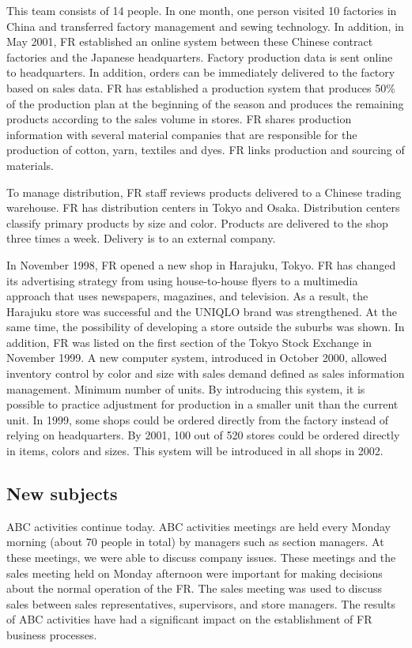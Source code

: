\documentclass[12pt,]{article}
\begin{document}
This team consists of 14 people. In one month, one person visited 10
factories in China and transferred factory management and sewing
technology. In addition, in May 2001, FR established an online system
between these Chinese contract factories and the Japanese headquarters.
Factory production data is sent online to headquarters. In addition,
orders can be immediately delivered to the factory based on sales data.
FR has established a production system that produces 50\% of the
production plan at the beginning of the season and produces the
remaining products according to the sales volume in stores. FR shares
production information with several material companies that are
responsible for the production of cotton, yarn, textiles and dyes. FR
links production and sourcing of materials.

To manage distribution, FR staff reviews products delivered to a Chinese
trading warehouse. FR has distribution centers in Tokyo and Osaka.
Distribution centers classify primary products by size and color.
Products are delivered to the shop three times a week. Delivery is to an
external company.

In November 1998, FR opened a new shop in Harajuku, Tokyo. FR has
changed its advertising strategy from using house-to-house flyers to a
multimedia approach that uses newspapers, magazines, and television. As
a result, the Harajuku store was successful and the UNIQLO brand was
strengthened. At the same time, the possibility of developing a store
outside the suburbs was shown. In addition, FR was listed on the first
section of the Tokyo Stock Exchange in November 1999. A new computer
system, introduced in October 2000, allowed inventory control by color
and size with sales demand defined as sales information management.
Minimum number of units. By introducing this system, it is possible to
practice adjustment for production in a smaller unit than the current
unit. In 1999, some shops could be ordered directly from the factory
instead of relying on headquarters. By 2001, 100 out of 520 stores could
be ordered directly in items, colors and sizes. This system will be
introduced in all shops in 2002.

\hypertarget{new-subjects}{%
\subsection{New subjects}\label{new-subjects}}

ABC activities continue today. ABC activities meetings are held every
Monday morning (about 70 people in total) by managers such as section
managers. At these meetings, we were able to discuss company issues.
These meetings and the sales meeting held on Monday afternoon were
important for making decisions about the normal operation of the FR. The
sales meeting was used to discuss sales between sales representatives,
supervisors, and store managers. The results of ABC activities have had
a significant impact on the establishment of FR business processes.
\end{document}
